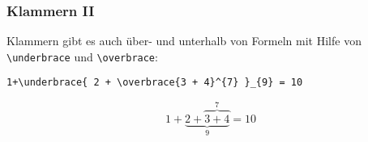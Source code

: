 \begin{frame}[fragile]
  \frametitle{Klammern II}



% 

  Klammern gibt es auch über- und unterhalb von Formeln mit Hilfe von
  \lstinline{\underbrace} und \lstinline{\overbrace}:
\begin{lstlisting}
1+\underbrace{ 2 + \overbrace{3 + 4}^{7} }_{9} = 10
\end{lstlisting}
  \begin{equation*}
    1+\underbrace{ 2 + \overbrace{3 + 4}^{7} }_{9} = 10
  \end{equation*}

\end{frame}

